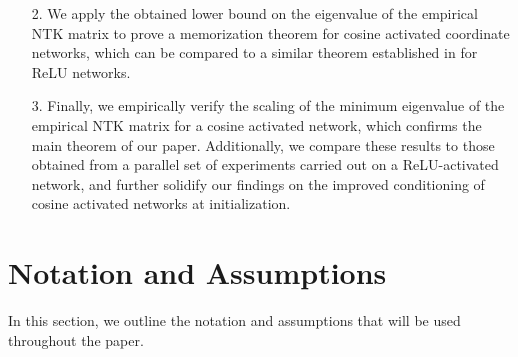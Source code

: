 \documentclass{article}
\theoremstyle{plain}
\theoremstyle{definition}
\theoremstyle{remark}
\begin{document}
\begin{enumerate}

    \item[2.] We apply the obtained lower bound on the eigenvalue of the empirical NTK matrix to prove a memorization theorem for cosine activated coordinate networks, which can be compared to a similar theorem established in \cite{nguyen2021tight} for ReLU networks.


    \item[3.] Finally, we empirically verify the scaling of the minimum eigenvalue of the empirical NTK matrix for a cosine activated network, which confirms the main theorem of our paper. Additionally, we compare these results to those obtained from a parallel set of experiments carried out on a ReLU-activated network, and further solidify our findings on the improved conditioning of cosine activated networks at initialization.
\end{enumerate}



\section{Notation and Assumptions}\label{notations}


In this section, we outline the notation and assumptions that will be used throughout the paper.
\end{document}
